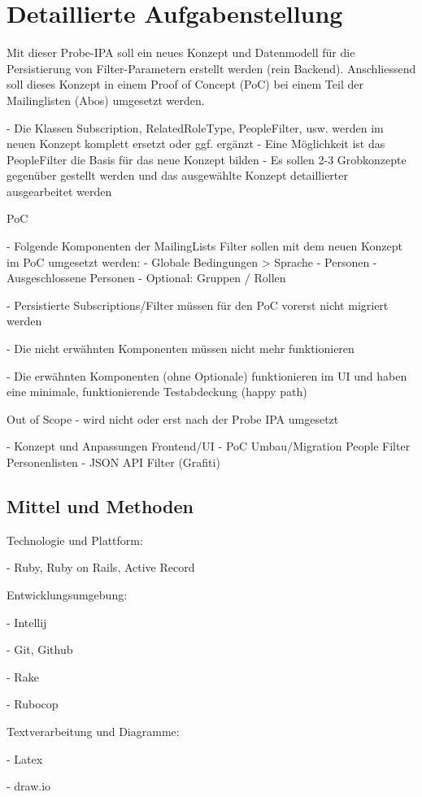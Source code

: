 \section{Detaillierte Aufgabenstellung}
Mit dieser Probe-IPA soll ein neues Konzept und Datenmodell für die Persistierung von Filter-Parametern erstellt werden (rein Backend). Anschliessend soll dieses Konzept in einem Proof of Concept (PoC) bei einem Teil der Mailinglisten (Abos) umgesetzt werden.

- Die Klassen Subscription, RelatedRoleType, PeopleFilter, usw. werden im neuen Konzept komplett ersetzt oder ggf. ergänzt
- Eine Möglichkeit ist das PeopleFilter die Basis für das neue Konzept bilden
- Es sollen 2-3 Grobkonzepte gegenüber gestellt werden und das ausgewählte Konzept detaillierter ausgearbeitet werden

PoC

- Folgende Komponenten der MailingLists Filter sollen mit dem neuen Konzept im PoC umgesetzt werden:
    - Globale Bedingungen > Sprache
    - Personen
    - Ausgeschlossene Personen
    - Optional: Gruppen / Rollen

- Persistierte Subscriptions/Filter müssen für den PoC vorerst nicht migriert werden

- Die nicht erwähnten Komponenten müssen nicht mehr funktionieren

- Die erwähnten Komponenten (ohne Optionale) funktionieren im UI und haben eine minimale, funktionierende Testabdeckung (happy path)

Out of Scope - wird nicht oder erst nach der Probe IPA umgesetzt

- Konzept und Anpassungen Frontend/UI
- PoC Umbau/Migration People Filter Personenlisten
- JSON API Filter (Grafiti)

\subsection{Mittel und Methoden}
Technologie und Plattform:

- Ruby, Ruby on Rails, Active Record

Entwicklungsumgebung:

- Intellij

- Git, Github

- Rake

- Rubocop

Textverarbeitung und Diagramme:

- Latex

- draw.io

